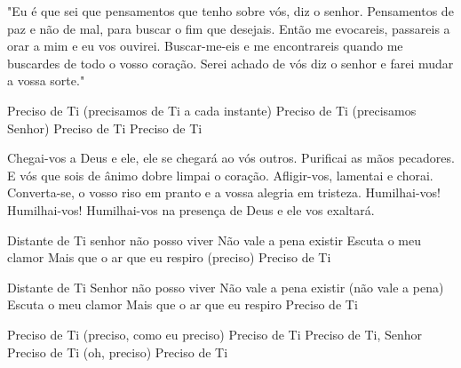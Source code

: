 "Eu é que sei que pensamentos que tenho sobre vós, diz o senhor.
Pensamentos de paz e não de mal, para buscar o fim que desejais.
Então me evocareis, passareis a orar a mim e eu vos ouvirei.
Buscar-me-eis e me encontrareis quando me buscardes de todo o vosso coração.
Serei achado de vós diz o senhor e farei mudar a vossa sorte."

Preciso de Ti (precisamos de Ti a cada instante)
Preciso de Ti (precisamos Senhor)
Preciso de Ti
Preciso de Ti

Chegai-vos a Deus e ele, ele se chegará ao vós outros.
Purificai as mãos pecadores.
E vós que sois de ânimo dobre limpai o coração.
Afligir-vos, lamentai e chorai.
Converta-se, o vosso riso em pranto e a vossa alegria em tristeza.
Humilhai-vos! Humilhai-vos!
Humilhai-vos na presença de Deus e ele vos exaltará.

Distante de Ti senhor não posso viver
Não vale a pena existir
Escuta o meu clamor
Mais que o ar que eu respiro (preciso)
Preciso de Ti

Distante de Ti Senhor não posso viver
Não vale a pena existir (não vale a pena)
Escuta o meu clamor
Mais que o ar que eu respiro
Preciso de Ti

Preciso de Ti (preciso, como eu preciso)
Preciso de Ti
Preciso de Ti, Senhor
Preciso de Ti (oh, preciso)
Preciso de Ti



